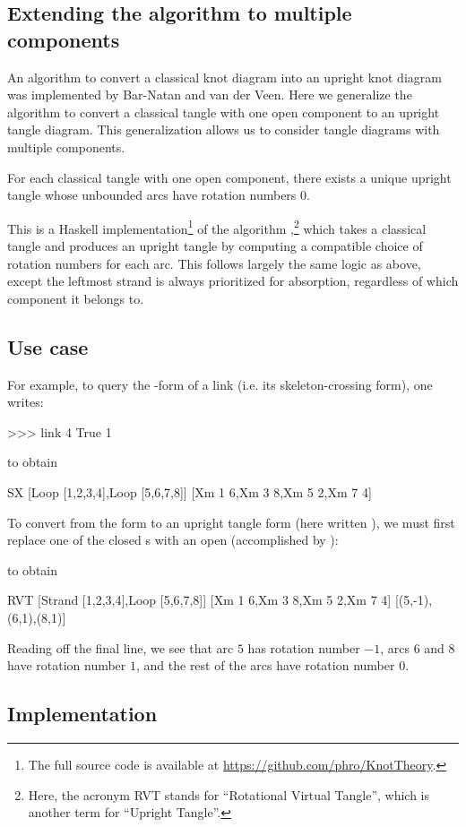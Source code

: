 \subsection{Extending the algorithm to multiple components}

An algorithm to convert a classical knot diagram into an upright knot diagram
was implemented by Bar-Natan and van der Veen. Here we generalize the algorithm
to convert a classical tangle with one open component to an upright tangle
diagram. This generalization allows us to consider tangle diagrams with multiple
components.

\begin{lemma}
        For each classical tangle with one open component, there exists a unique
        upright tangle whose unbounded arcs have rotation numbers $0$.
\end{lemma}

This is a Haskell implementation\footnote{The full source code is available at
\url{https://github.com/phro/KnotTheory}.} of the algorithm ,\footnote{Here, the
acronym RVT stands for \enquote{Rotational Virtual Tangle}, which is
another term for \enquote{Upright Tangle}.} which takes a classical tangle and
produces an upright tangle by computing a compatible choice of rotation numbers
for each arc. This follows largely the same logic as above, except the leftmost
strand is always prioritized for absorption, regardless of which component it
belongs to.

\subsection{Use case}

For example, to query the -form of a link (i.e. its skeleton-crossing
form), one writes:
\begin{code}
>>> link 4 True 1
\end{code}
to obtain
\begin{code}
SX [Loop [1,2,3,4],Loop [5,6,7,8]]
   [Xm 1 6,Xm 3 8,Xm 5 2,Xm 7 4]
\end{code}
To convert from the  form to an upright tangle form (here written
), we must first replace one of the closed s with an open
 (accomplished by ):
to obtain
\begin{code}
RVT [Strand [1,2,3,4],Loop [5,6,7,8]]
    [Xm 1 6,Xm 3 8,Xm 5 2,Xm 7 4]
    [(5,-1),(6,1),(8,1)]
\end{code}
Reading off the final line, we see that arc $5$ has rotation number $-1$, arcs
$6$ and $8$ have rotation number $1$, and the rest of the arcs have rotation
number $0$.

\subsection{Implementation}


